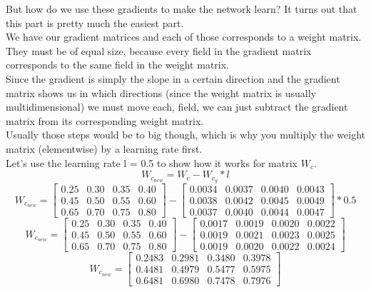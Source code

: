 \documentclass[11pt, halfparskip]{article}
\begin{document}
    \newpage \noindent
    But how do we use these gradients to make the network learn? It turns out that this part is pretty much the easiest part.\\
    We have our gradient matrices and each of those corresponds to a weight matrix. They must be of equal size, because every field in the gradient matrix corresponds to the same field
    in the weight matrix.\\
    Since the gradient is simply the slope in a certain direction and the gradient matrix shows us in which directions (since the weight matrix is usually multidimensional) we must move each,
    field, we can just subtract the gradient matrix from its corresponding weight matrix.\\
    Usually those steps would be to big though, which is why you multiply the weight matrix (elementwise) by a learning rate first.\\
    Let's use the learning rate l = 0.5 to show how it works for matrix $W_c$.
    \[
    	W_{c_{new}} = W_c - W_{c_g} * l
    \]
    \[
    	W_{c_{new}} = 
    	\begin{bmatrix}
            	0.25 & 0.30 & 0.35 & 0.40\\
            	0.45 & 0.50 & 0.55 & 0.60\\
            	0.65 & 0.70 & 0.75 & 0.80
            \end{bmatrix}
            -
    	\begin{bmatrix}
        		0.0034 & 0.0037 & 0.0040 & 0.0043\\
        		0.0038 & 0.0042 & 0.0045 & 0.0049\\
        		0.0037 & 0.0040 & 0.0044 & 0.0047
        	\end{bmatrix}
        	* 0.5
    \]
    \[
    	W_{c_{new}} = 
    	\begin{bmatrix}
            	0.25 & 0.30 & 0.35 & 0.40\\
            	0.45 & 0.50 & 0.55 & 0.60\\
            	0.65 & 0.70 & 0.75 & 0.80
            \end{bmatrix}
            -
    	\begin{bmatrix}
        		0.0017 & 0.0019 & 0.0020 & 0.0022\\
        		0.0019 & 0.0021 & 0.0023 & 0.0025\\
        		0.0019 & 0.0020 & 0.0022 & 0.0024
        	\end{bmatrix}
    \]
    \[
    	W_{c_{new}} = 
    	\begin{bmatrix}
            	0.2483 & 0.2981 & 0.3480 & 0.3978\\
            	0.4481 & 0.4979 & 0.5477 & 0.5975\\
            	0.6481 & 0.6980 & 0.7478 & 0.7976
            \end{bmatrix}
    \]
    
\end{document}
